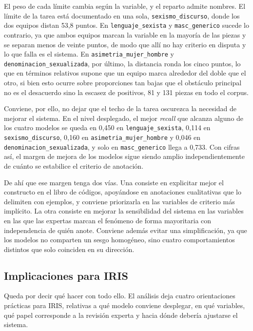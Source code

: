 El peso de cada límite cambia según la variable, y el reparto admite nombres. El
límite de la tarea está documentado en una sola, \texttt{sexismo\_discurso}, donde los
dos equipos distan 53,8 puntos. En \texttt{lenguaje\_sexista} y
\texttt{masc\_generico} sucede lo contrario, ya que ambos equipos marcan la variable en
la mayoría de las piezas y se separan menos de veinte puntos, de modo que allí no hay
criterio en disputa y lo que falla es el sistema. En
\texttt{asimetria\_mujer\_hombre} y \texttt{denominacion\_sexualizada}, por último, la
distancia ronda los cinco puntos, lo que en términos relativos supone que un equipo
marca alrededor del doble que el otro, si bien esto ocurre sobre proporciones tan bajas que el
obstáculo principal no es el desacuerdo sino la escasez de positivos, 81 y 131 piezas
en todo el corpus.

Conviene, por ello, no dejar que el techo de la tarea oscurezca la necesidad de mejorar el sistema. En el nivel
desplegado, el mejor \textit{recall} que alcanza alguno de los cuatro modelos se queda en 0,450
en \texttt{lenguaje\_sexista}, 0,114 en \texttt{sexismo\_discurso}, 0,160 en
\texttt{asimetria\_mujer\_hombre} y 0,046 en \texttt{denominacion\_sexualizada}, y solo
en \texttt{masc\_generico} llega a 0,733. Con cifras así, el margen de mejora de los
modelos sigue siendo amplio independientemente de cuánto se estabilice el criterio de anotación.

De ahí que ese margen tenga dos vías. Una consiste en explicitar mejor el constructo en
el libro de códigos, apoyándose en anotaciones cualitativas que lo delimiten con
ejemplos, y conviene priorizarla en las variables de criterio más implícito. La
otra consiste en mejorar la sensibilidad del sistema en las variables en las que las
expertas marcan el fenómeno de forma mayoritaria con independencia de quién anote. Conviene además evitar una simplificación, ya que
los modelos no comparten un sesgo homogéneo, sino cuatro comportamientos distintos
que solo coinciden en su dirección.

\subsection{Implicaciones para IRIS}
\label{subsec:iris_implicaciones}

Queda por decir qué hacer con todo ello. El análisis deja cuatro orientaciones
prácticas para IRIS, relativas a qué modelo conviene desplegar, en qué variables, qué
papel corresponde a la revisión experta y hacia dónde debería ajustarse el sistema.

